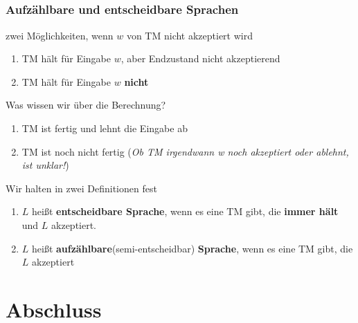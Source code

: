 \subsection*{}
\begin{frame}
  \frametitle{Aufzählbare und entscheidbare Sprachen}
  \begin{block}{zwei Möglichkeiten, wenn $w$ von TM nicht akzeptiert wird}
\begin{enumerate}
\pause
	\item TM hält für Eingabe $w$, aber Endzustand nicht akzeptierend
	\pause
  \item	TM hält für Eingabe $w$ \textbf{nicht}
\end{enumerate}
\end{block}
\pause
  \begin{block}{Was wissen wir über die Berechnung?}
\begin{enumerate}
\pause
	\item TM ist fertig und lehnt die Eingabe ab
\pause
  \item	TM ist noch nicht fertig (\textit{Ob TM irgendwann w noch akzeptiert oder ablehnt, ist unklar!})
\end{enumerate}
\end{block}
\pause
  \begin{block}{Wir halten in zwei Definitionen fest}
\begin{enumerate}
	\item $L$ heißt \textbf{entscheidbare Sprache}, wenn es eine TM gibt, die \textbf{immer hält} und $L$ akzeptiert.
	\pause
	\item $L$ heißt \textbf{aufzählbare}(semi-entscheidbar) \textbf{Sprache}, wenn es eine TM gibt, die $L$ akzeptiert
\end{enumerate}
\end{block}
\end{frame}


\section{Abschluss}
